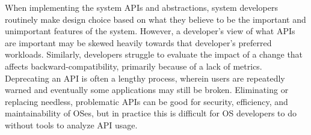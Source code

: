 

When implementing the system APIs and abstractions,
system developers routinely make design choice based on
what they believe to be the important and unimportant features of the system.
However, a developer's view of what APIs are important
may be skewed heavily towards that developer's preferred workloads.
Similarly, developers struggle to evaluate the impact of a 
change that affects backward-compatibility,
primarily because of a lack of metrics.
Deprecating an API is often a lengthy process, wherein
users are repeatedly warned 
and eventually some applications may still be broken.
Eliminating or replacing needless, problematic APIs 
can be good for security, efficiency, and maintainability of OSes,
but in practice this is difficult for OS developers to do without tools to analyze API usage.

